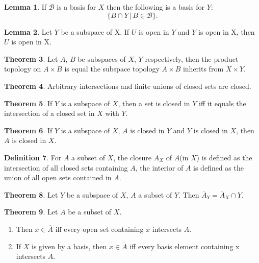 \documentclass[twocolumn]{article}
\theoremstyle{definition}
\newtheorem{definition}{Definition}[section]
\newtheorem{theorem}[definition]{Theorem}
\newtheorem{lemma}[definition]{Lemma}
\begin{document}
\begin{lemma}
    If $\mathcal{B}$ is a basis for $X$ then the following is a basis for $Y$:
    \begin{equation}
        \{ B \cap Y \, | \, B \in \mathcal{B} \}.
    \end{equation}
\end{lemma}
\begin{lemma}
    Let $Y$ be a subspace of X. If $U$ is open in $Y$ and $Y$ is open in X, then $U$ is open in X.
\end{lemma}
\begin{theorem}
    Let $A$, $B$ be subspaces of $X$, $Y$ respectively, then the product topology on $A \times B$ is
    equal the subspace topology $A \times B$ inherits from $X \times Y$.
\end{theorem}
\begin{theorem}
    Arbitrary intersections and finite unions of closed sets are closed.
\end{theorem}
\begin{theorem}
    If $Y$ is a subspace of $X$, then a set is closed in $Y$ iff it equals the intersection of a closed set in $X$ with $Y$.
\end{theorem}
\begin{theorem}
    If $Y$ is a subspace of $X$, $A$ is closed in $Y$ and $Y$ is closed in $X$, then $A$ is closed in $X$.
\end{theorem}
\begin{definition}
    For $A$ a subset of $X$, the closure $\overline{A}_X$ of $A$(in $X$) is defined as the intersection of all closed sets containing $A$,
    the interior of $A$ is defined as the union of all open sets contained in $A$.
\end{definition}
\begin{theorem}
    Let $Y$ be a subspace of $X$, $A$ a subset of $Y$. Then $\overline{A}_Y = \overline{A}_X \cap Y$.
\end{theorem}
\begin{theorem}
    Let $A$ be a subset of $X$.
    \begin{enumerate}[noitemsep]
        \item Then $x \in \overline{A}$ iff every open set containing $x$ intersects $A$.
        \item If $X$ is given by a basis, then $x \in \overline{A}$ iff every basis element containing x intersects $A$.
    \end{enumerate}
\end{theorem}
\end{document}
